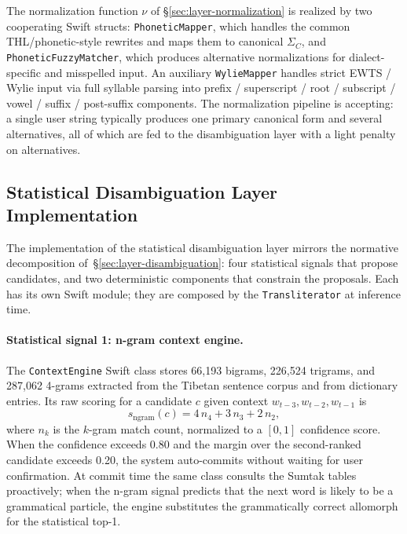 \documentclass[11pt]{article}
\begin{document}
The normalization function $\nu$ of \S\ref{sec:layer-normalization} is realized by two cooperating Swift structs: \texttt{PhoneticMapper}, which handles the common THL/phonetic-style rewrites and maps them to canonical $\Sigma_C$, and \texttt{PhoneticFuzzyMatcher}, which produces alternative normalizations for dialect-specific and misspelled input. An auxiliary \texttt{WylieMapper} handles strict EWTS / Wylie input via full syllable parsing into prefix / superscript / root / subscript / vowel / suffix / post-suffix components. The normalization pipeline is accepting: a single user string typically produces one primary canonical form and several alternatives, all of which are fed to the disambiguation layer with a light penalty on alternatives.

\subsection{Statistical Disambiguation Layer Implementation}
\label{sec:arch-disambiguation}

The implementation of the statistical disambiguation layer mirrors the normative decomposition of~\S\ref{sec:layer-disambiguation}: four statistical signals that propose candidates, and two deterministic components that constrain the proposals. Each has its own Swift module; they are composed by the \texttt{Transliterator} at inference time.

\paragraph{Statistical signal 1: n-gram context engine.}
The \texttt{ContextEngine} Swift class stores 66{,}193 bigrams, 226{,}524 trigrams, and 287{,}062 4-grams extracted from the Tibetan sentence corpus and from dictionary entries. Its raw scoring for a candidate $c$ given context $w_{t-3}, w_{t-2}, w_{t-1}$ is
\[
s_{\text{ngram}}(c) = 4 \, n_4 + 3 \, n_3 + 2 \, n_2,
\]
where $n_k$ is the $k$-gram match count, normalized to a $[0,1]$ confidence score. When the confidence exceeds 0.80 and the margin over the second-ranked candidate exceeds 0.20, the system auto-commits without waiting for user confirmation. At commit time the same class consults the Sumtak tables proactively; when the n-gram signal predicts that the next word is likely to be a grammatical particle, the engine substitutes the grammatically correct allomorph for the statistical top-1.
\end{document}
